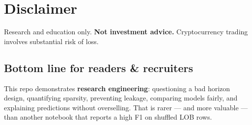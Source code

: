 \documentclass[11pt,a4paper]{article}
\begin{document}
\section{Disclaimer}

Research and education only. \textbf{Not investment advice.} Cryptocurrency trading involves substantial risk of loss.


\vspace{0.5em}

\subsection{Bottom line for readers \& recruiters}

This repo demonstrates \textbf{research engineering}: questioning a bad horizon design, quantifying sparsity, preventing leakage, comparing models fairly, and explaining predictions without overselling. That is rarer --- and more valuable --- than another notebook that reports a high F1 on shuffled LOB rows.
\end{document}
